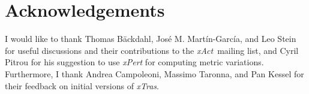 \documentclass[a4paper,11pt,english]{article}
\newcommand{\xAct}{\emph{xAct}}
\newcommand{\xTras}{\emph{xTras}}
\begin{document}
\section*{Acknowledgements}

I would like to thank Thomas B\"ackdahl, Jos\'e M. Mart\'in-Garc\'ia, and Leo Stein for 
useful discussions and their contributions to the \xAct~mailing list, and Cyril Pitrou for
his suggestion to use \emph{xPert} for computing metric variations.
Furthermore, I thank Andrea Campoleoni, Massimo Taronna, and Pan Kessel for their feedback
on initial versions of \xTras.

\begingroup
\setlength{\emergencystretch}{8em}
\printbibliography
\endgroup
\end{document}
